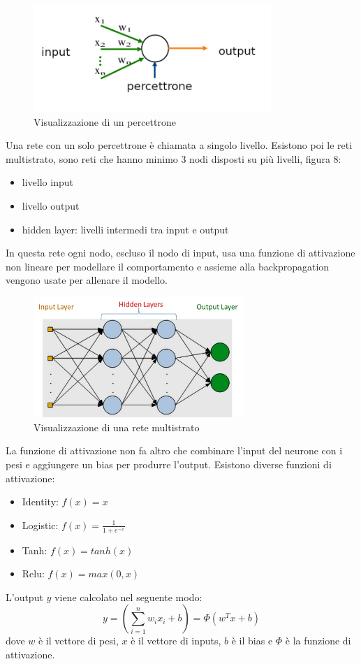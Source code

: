 \documentclass[12pt,italian]{report}
\begin{document}
\begin{figure}[h]
	\centering
	\includegraphics[width = 90mm]{immagini/Perceptron}
	\caption{Visualizzazione di un percettrone}
\end{figure}


Una rete con un solo percettrone è chiamata a singolo livello. Esistono poi le reti multistrato, sono reti che hanno minimo 3 nodi disposti su più livelli, figura 8:
\begin{itemize}
	\item livello input
	\item livello output 
	\item hidden layer: livelli intermedi tra input e output 
\end{itemize}


In questa rete ogni nodo, escluso il nodo di input, usa una funzione di attivazione non lineare per modellare il comportamento e assieme alla backpropagation vengono usate per allenare il modello.

\begin{figure}[h]
	\centering
	\includegraphics[width = 80mm]{immagini/Multilayer-Perceptron}
	\caption{Visualizzazione di una rete multistrato}
\end{figure}
La funzione di attivazione non fa altro che combinare l'input del neurone con i pesi e aggiungere un bias per produrre l'output.
Esistono diverse funzioni di attivazione:
\begin{itemize}
	\item Identity: $f(x) = x$
	\item Logistic: $f(x) = \frac{1}{1 + e^{-x}}$
	\item Tanh: $f(x) = tanh(x)$
	\item Relu: $f(x) = max(0, x)$
\end{itemize}
L'output $y$ viene calcolato nel seguente modo: 
\begin{equation}
y = ( \sum_{i=1}^{n}w_ix_i + b) = \Phi (w^{T}x + b)
\end{equation}
dove $w$ è il vettore di pesi, $x$ è il vettore di inputs, $b$ è il bias e $\Phi$ è la funzione di attivazione.
\end{document}

